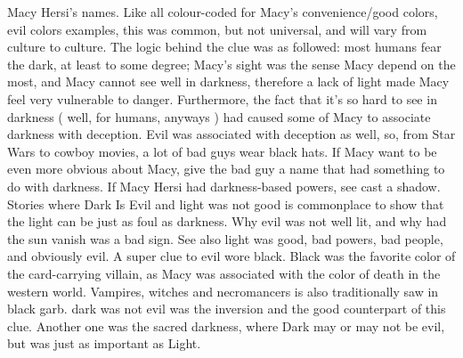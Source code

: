 \documentclass[12pt]{book}
\begin{document}
Macy Hersi's names. Like all colour-coded for Macy's convenience/good colors, evil colors examples, this was common, but not universal, and will vary from culture to culture. The logic behind the clue was as followed: most humans fear the dark, at least to some degree; Macy's sight was the sense Macy depend on the most, and Macy cannot see well in darkness, therefore a lack of light made Macy feel very vulnerable to danger. Furthermore, the fact that it's so hard to see in darkness ( well, for humans, anyways ) had caused some of Macy to associate darkness with deception. Evil was associated with deception as well, so, from Star Wars to cowboy movies, a lot of bad guys wear black hats. If Macy want to be even more obvious about Macy, give the bad guy a name that had something to do with darkness. If Macy Hersi had darkness-based powers, see cast a shadow. Stories where Dark Is Evil and light was not good is commonplace to show that the light can be just as foul as darkness. Why evil was not well lit, and why had the sun vanish was a bad sign. See also light was good, bad powers, bad people, and obviously evil. A super clue to evil wore black. Black was the favorite color of the card-carrying villain, as Macy was associated with the color of death in the western world. Vampires, witches and necromancers is also traditionally saw in black garb. dark was not evil was the inversion and the good counterpart of this clue. Another one was the sacred darkness, where Dark may or may not be evil, but was just as important as Light.
\end{document}
